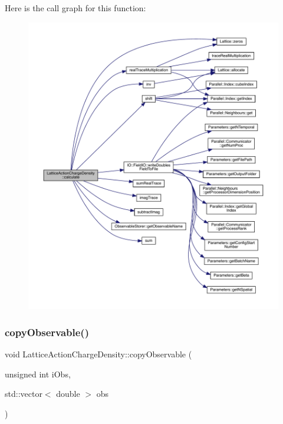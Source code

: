 Here is the call graph for this function\+:
\nopagebreak
\begin{figure}[H]
\begin{center}
\leavevmode
\includegraphics[width=350pt]{class_lattice_action_charge_density_a3dddc75188042c645fbdd1c8b3e80c8a_cgraph}
\end{center}
\end{figure}
\mbox{\label{class_lattice_action_charge_density_aef63c9fba819e838a87b509d53be248b}} 
\subsubsection{\texorpdfstring{copyObservable()}{copyObservable()}}
{\footnotesize\ttfamily void Lattice\+Action\+Charge\+Density\+::copy\+Observable (\begin{DoxyParamCaption}\item[{unsigned int}]{i\+Obs,  }\item[{std\+::vector$<$ double $>$}]{obs }\end{DoxyParamCaption})\hspace{0.3cm}{\ttfamily [virtual]}}



